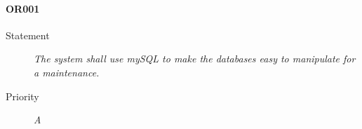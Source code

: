 \paragraph{OR001}
  \begin{description}
  \item [Statement] 
    \textit{ The system shall use mySQL to make the databases easy to manipulate for a maintenance.}
  \item [Priority] \textit{A}
\end{description}